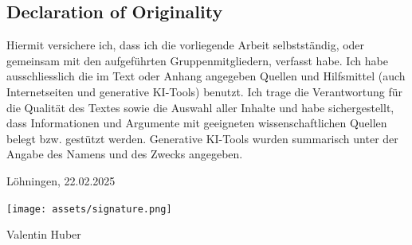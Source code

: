 \documentclass[twocolumn]{article}
\begin{document}
\begin{center}
  \begin{minipage}{0.7\textwidth}
    \vspace{100px}

    \begin{center}
      \section*{Declaration of Originality}
    \end{center}
    \vspace{3ex}

    \setlength{\parindent}{1.5em}

    Hiermit versichere ich, dass ich die vorliegende Arbeit selbstständig, oder gemeinsam mit den aufgeführten Gruppenmitgliedern, verfasst habe. Ich habe ausschliesslich die im Text oder Anhang angegeben Quellen und Hilfsmittel (auch Internetseiten und generative KI-Tools) benutzt. Ich trage die Verantwortung für die Qualität des Textes sowie die Auswahl aller Inhalte und habe sichergestellt, dass Informationen und Argumente mit geeigneten wissenschaftlichen Quellen belegt bzw. gestützt werden. Generative KI-Tools wurden summarisch unter der Angabe des Namens und des Zwecks angegeben.

    \vspace{10ex}
    \begin{minipage}[b]{0.5\textwidth}
      Löhningen, 22.02.2025
    \end{minipage}%
    \begin{minipage}[b]{0.5\textwidth}

      \texttt{[image: assets/signature.png]}

      \setlength{\parindent}{4em}
      Valentin Huber

    \end{minipage}
  \end{minipage}
\end{center}


\clearpage\newpage
\end{document}
